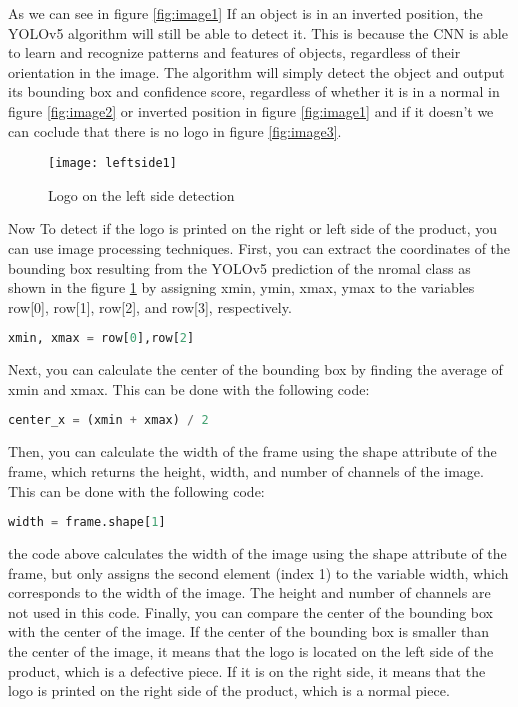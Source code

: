 \begin{itemize}
\begin{figure}[htbp]
    
\end{figure}
\FloatBarrier
As we can see in figure \ref{fig:image1} If an object is in an inverted position, the YOLOv5 algorithm will still be able to detect it. This is because the CNN is able to learn and recognize patterns and features of objects, regardless of their orientation in the image. The algorithm will simply detect the object and output its bounding box and confidence score, regardless of whether it is in a normal  in figure \ref{fig:image2}  or inverted position  in figure \ref{fig:image1} and if it doesn't we can coclude that there is no logo  in figure \ref{fig:image3}.
\begin{figure}[htbp]

    

        \centering
        \texttt{[image: leftside1]}
        \caption{Logo on the left side detection}
        \label{fig:image4}
\end{figure}
Now To detect if the logo is printed on the right or left side of the product, you can use image processing techniques. First, you can extract the coordinates of the bounding box resulting from the YOLOv5 prediction of the nromal class as shown in the figure \ref{fig:image4} by assigning xmin, ymin, xmax, ymax to the variables row[0], row[1], row[2], and row[3], respectively.
\begin{lstlisting}[language=Python]
xmin, xmax = row[0],row[2]
\end{lstlisting}
Next, you can calculate the center of the bounding box by finding the average of xmin and xmax. This can be done with the following code:
\begin{lstlisting}[language=Python]
center_x = (xmin + xmax) / 2
\end{lstlisting}
Then, you can calculate the width of the frame using the shape attribute of the frame, which returns the height, width, and number of channels of the image. This can be done with the following code:
\begin{lstlisting}[language=Python]
width = frame.shape[1]
\end{lstlisting}
the code above  calculates the width of the image using the shape attribute of the frame, but only assigns the second element (index 1) to the variable width, which corresponds to the width of the image. The height and number of channels are not used in this code.
Finally, you can compare the center of the bounding box with the center of the image. If the center of the bounding box is smaller than the center of the image, it means that the logo is located on the left side of the product, which is a defective piece. If it is on the right side, it means that the logo is printed on the right side of the product, which is a normal piece.
\end{itemize}

